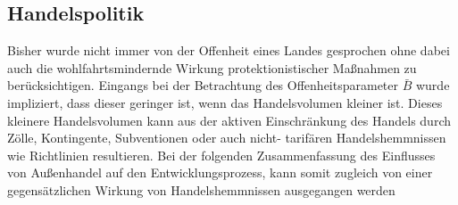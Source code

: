 \subsection{Handelspolitik}
Bisher wurde nicht immer von der Offenheit eines Landes gesprochen ohne dabei auch die wohlfahrtsmindernde Wirkung protektionistischer Maßnahmen zu berücksichtigen. Eingangs bei der Betrachtung des Offenheitsparameter $\bar{B}$ wurde impliziert, dass dieser geringer ist, wenn das Handelsvolumen kleiner ist. Dieses kleinere Handelsvolumen kann aus der aktiven Einschränkung des Handels durch Zölle, Kontingente, Subventionen oder auch nicht- tarifären Handelshemmnissen wie Richtlinien resultieren. Bei der folgenden Zusammenfassung des Einflusses von Außenhandel auf den Entwicklungsprozess, kann somit zugleich von einer gegensätzlichen Wirkung von Handelshemmnissen ausgegangen werden
%
